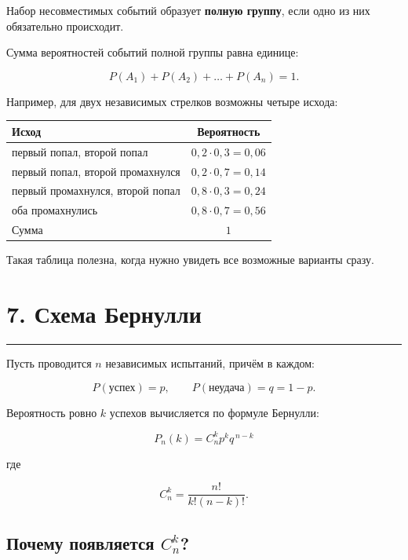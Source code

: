 \documentclass[a4paper,12pt]{article}
\newcommand{\accentline}{%
    \vspace{0.3em}
    {\color{accent}\rule{\linewidth}{0.7pt}}
    \vspace{0.5em}
}
\newcommand{\important}[1]{\textbf{\color{darkaccent}#1}}
\begin{document}
Набор несовместимых событий образует \important{полную группу}, если одно
из них обязательно происходит.

Сумма вероятностей событий полной группы равна единице:

\[
\boxed{
P(A_1)+P(A_2)+\ldots+P(A_n)=1
}.
\]

Например, для двух независимых стрелков возможны четыре исхода:

\begin{center}
\renewcommand{\arraystretch}{1.35}
\begin{tabularx}{0.83\linewidth}{@{}X c@{}}
\toprule
Исход & Вероятность \\
\midrule
первый попал, второй попал &
$0,2\cdot0,3=0,06$ \\

первый попал, второй промахнулся &
$0,2\cdot0,7=0,14$ \\

первый промахнулся, второй попал &
$0,8\cdot0,3=0,24$ \\

оба промахнулись &
$0,8\cdot0,7=0,56$ \\
\midrule
Сумма &
$1$ \\
\bottomrule
\end{tabularx}
\end{center}

Такая таблица полезна, когда нужно увидеть все возможные варианты сразу.


\section*{\color{darkaccent}7. Схема Бернулли}
\accentline

Пусть проводится $n$ независимых испытаний, причём в каждом:

\[
P(\text{успех})=p,
\qquad
P(\text{неудача})=q=1-p.
\]

Вероятность ровно $k$ успехов вычисляется по формуле Бернулли:

\[
\boxed{
P_n(k)
=
C_n^k p^k q^{\,n-k}
}
\]

где

\[
C_n^k
=
\frac{n!}{k!(n-k)!}.
\]

\subsection*{Почему появляется $C_n^k$?}
\end{document}
